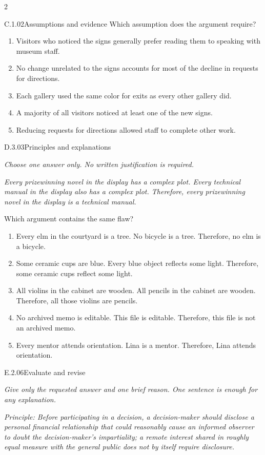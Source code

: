 \documentclass[9pt]{extarticle}
\newcommand{\choice}[1]{\item #1}
\begin{document}
\begin{multicols}{2}
\begin{DenseCoreProblem}{C.1.02}{Assumptions and evidence}
Which assumption does the argument require?
\begin{enumerate}[label=(\alph*)]
  \choice{Visitors who noticed the signs generally prefer reading them to speaking with museum staff.}
  \choice{No change unrelated to the signs accounts for most of the decline in requests for directions.}
  \choice{Each gallery used the same color for exits as every other gallery did.}
  \choice{A majority of all visitors noticed at least one of the new signs.}
  \choice{Reducing requests for directions allowed staff to complete other work.}
\end{enumerate}
\end{DenseCoreProblem}
\begin{DenseCoreProblem}{D.3.03}{Principles and explanations}
{\scriptsize\textit{Choose one answer only. No written justification is required.}\par}
\emph{Every prizewinning novel in the display has a complex plot. Every technical manual in the display also has a complex plot. Therefore, every prizewinning novel in the display is a technical manual.}

Which argument contains the same flaw?
\begin{enumerate}[label=(\alph*)]
  \choice{Every elm in the courtyard is a tree. No bicycle is a tree. Therefore, no elm is a bicycle.}
  \choice{Some ceramic cups are blue. Every blue object reflects some light. Therefore, some ceramic cups reflect some light.}
  \choice{All violins in the cabinet are wooden. All pencils in the cabinet are wooden. Therefore, all those violins are pencils.}
  \choice{No archived memo is editable. This file is editable. Therefore, this file is not an archived memo.}
  \choice{Every mentor attends orientation. Lina is a mentor. Therefore, Lina attends orientation.}
\end{enumerate}
\end{DenseCoreProblem}
\begin{DenseCoreProblem}{E.2.06}{Evaluate and revise}
{\scriptsize\textit{Give only the requested answer and one brief reason. One sentence is enough for any explanation.}\par}
\emph{Principle: Before participating in a decision, a decision-maker should disclose a personal financial relationship that could reasonably cause an informed observer to doubt the decision-maker's impartiality; a remote interest shared in roughly equal measure with the general public does not by itself require disclosure.}


\end{DenseCoreProblem}
\end{multicols}
\end{document}
